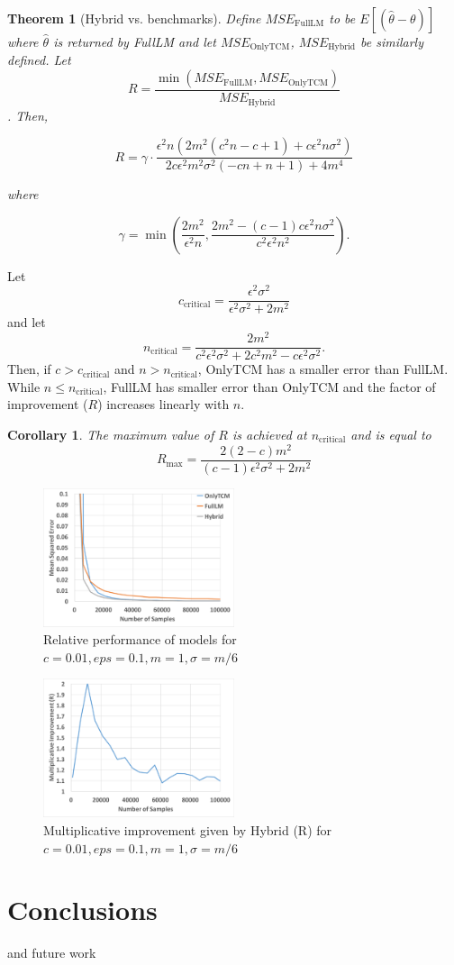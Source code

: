 \documentclass{article}
\theoremstyle{plain}
\newtheorem{thm}{Theorem}[section]
\newtheorem*{cor}{Corollary}
\begin{document}
\begin{thm}[Hybrid vs. benchmarks]
Define $MSE_{\text{FullLM}}$ to be $E[(\hat{\theta} - \theta)]$ where $\hat{\theta}$ is returned by FullLM and let $MSE_{\text{OnlyTCM}}$, $MSE_{\text{Hybrid}}$ be similarly defined.
Let 
$$R = \frac{\min(MSE_{\text{FullLM}}, MSE_{\text{OnlyTCM}})}{MSE_{\text{Hybrid}}}$$.
Then, 

$$R = \gamma \cdot \frac{\epsilon^2 n \left(2 m^2 \left(c^2 n-c+1\right)+c \epsilon^2 n \sigma^2\right)}{2 c \epsilon^2 m^2 \sigma^2 (-c n+n+1)+4 m^4}$$

where 

$$\gamma = \min \left(\frac{2 m^2}{\epsilon^2 n},\frac{2 m^2-(c-1) c \epsilon^2 n \sigma^2}{c^2 \epsilon^2 n^2}\right).$$
\end{thm}

Let $$c_{\text{critical}} = \frac{\epsilon^2 \sigma^2}{\epsilon^2 \sigma^2+2 m^2}$$ and let $$n_{\text{critical}} = \frac{2 m^2}{c^2 \epsilon^2 \sigma^2+2 c^2 m^2-c \epsilon^2 \sigma^2}.$$ Then, if $c>c_{\text{critical}}$ and $n > n_{\text{critical}}$, OnlyTCM has a smaller error than FullLM. While $n \leq n_{\text{critical}}$, FullLM has smaller error than OnlyTCM and the factor of improvement ($R$) increases linearly with $n$. 

\begin{cor}
The maximum value of $R$ is achieved at $n_{\text{critical}}$ and is equal to $$R_{\text{max}} = \frac{2 (2-c) m^2}{(c-1) \epsilon^2 \sigma^2+2 m^2}$$
\end{cor}

\begin{figure}[h]
\includegraphics[width=0.5\textwidth]{eps01c01.pdf}
\caption{Relative performance of models for $c=0.01, eps=0.1, m=1, \sigma = m/6$}
\end{figure}

\begin{figure}[h]
\includegraphics[width=0.5\textwidth]{imp_eps01c01.pdf}
\caption{Multiplicative improvement given by Hybrid (R) for $c=0.01, eps=0.1, m=1, \sigma = m/6$}
\end{figure}


\section{Conclusions}
and future work

\small


\end{document}
